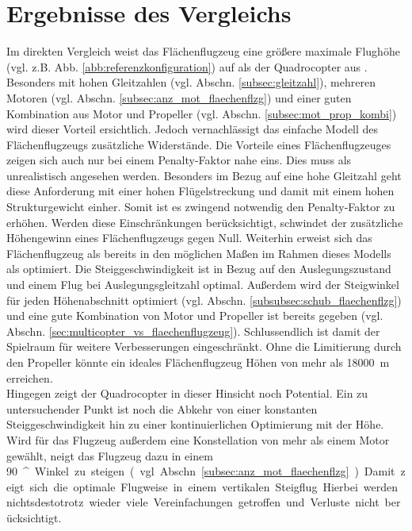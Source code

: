 \section{Ergebnisse des Vergleichs} 
Im direkten Vergleich weist das Flächenflugzeug eine größere maximale Flughöhe (vgl. z.B. Abb. \ref{abb:referenzkonfiguration}) auf als der Quadrocopter aus \cite{Anderson.2018}. Besonders mit hohen Gleitzahlen (vgl. Abschn. \ref{subsec:gleitzahl}), mehreren Motoren (vgl. Abschn. \ref{subsec:anz_mot_flaechenflzg}) und einer guten Kombination aus Motor und Propeller (vgl. Abschn. \ref{subsec:mot_prop_kombi}) wird dieser Vorteil ersichtlich. Jedoch vernachlässigt das einfache Modell des Flächenflugzeugs zusätzliche Widerstände. Die Vorteile eines Flächenflugzeuges zeigen sich auch nur bei einem Penalty-Faktor nahe eins. Dies muss als unrealistisch angesehen werden. Besonders im Bezug auf eine hohe Gleitzahl geht diese Anforderung mit einer hohen Flügelstreckung und damit mit einem hohen Strukturgewicht einher. Somit ist es zwingend notwendig den Penalty-Faktor zu erhöhen. Werden diese Einschränkungen berücksichtigt, schwindet der zusätzliche Höhengewinn eines Flächenflugzeugs gegen Null. Weiterhin erweist sich das Flächenflugzeug als bereits in den möglichen Maßen im Rahmen dieses Modells als optimiert. Die Steiggeschwindigkeit ist in Bezug auf den Auslegungszustand und einem Flug bei Auslegungsgleitzahl optimal. Außerdem wird der Steigwinkel für jeden Höhenabschnitt optimiert (vgl. Abschn. \ref{subsubsec:schub_flaechenflzg}) und eine gute Kombination von Motor und Propeller ist bereits gegeben (vgl. Abschn. \ref{sec:multicopter_vs_flaechenflugzeug}). Schlussendlich ist damit der Spielraum für weitere Verbesserungen eingeschränkt. Ohne die Limitierung durch den Propeller könnte ein  ideales Flächenflugzeug Höhen von mehr als \SI{18000}{m} erreichen. \\
Hingegen zeigt der Quadrocopter in dieser Hinsicht noch Potential. Ein zu untersuchender Punkt ist noch die Abkehr von einer konstanten Steiggeschwindigkeit hin zu einer kontinuierlichen Optimierung mit der Höhe. %
Wird für das Flugzeug außerdem eine Konstellation von mehr als einem Motor gewählt, neigt das Flugzeug dazu in einem \SI{90}{^\circ} Winkel zu steigen (vgl. Abschn. \ref{subsec:anz_mot_flaechenflzg}). Damit zeigt sich die optimale Flugweise in einem vertikalen Steigflug. Hierbei werden nichtsdestotrotz wieder viele Vereinfachungen getroffen und Verluste nicht berücksichtigt. 
